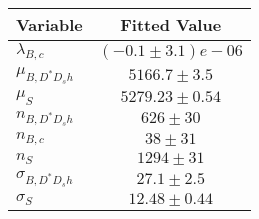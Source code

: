\begin{tabular}[t]{lc}
\hline
Variable &Fitted Value\\
\hline\hline
$\lambda_{B,c}$&$(-0.1\pm3.1)e-06$\\
\hline
$\mu_{B, D^* D_s h}$&$5166.7\pm3.5$\\
\hline
$\mu_S$&$5279.23\pm0.54$\\
\hline
$n_{B, D^* D_s h}$&$626\pm30$\\
\hline
$n_{B,c}$&$38\pm31$\\
\hline
$n_S$&$1294\pm31$\\
\hline
$\sigma_{B, D^* D_s h}$&$27.1\pm2.5$\\
\hline
$\sigma_S$&$12.48\pm0.44$\\
\hline
\end{tabular}